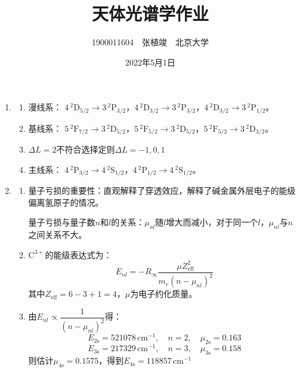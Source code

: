 \documentclass[a4paper]{article}
\begin{document}
\title{\textbf{天体光谱学作业}}
\author{1900011604\ \ 张植竣\ \ 北京大学}
\date{2022年5月1日}
\maketitle

\begin{enumerate}

    \item[1.]
    \begin{enumerate}
        \item[(a)] 漫线系：
        $4\,^2\mathrm{D}_{5/2} \rightarrow 3\,^2\mathrm{P}_{3/2}$，$4\,^2\mathrm{D}_{3/2} \rightarrow 3\,^2\mathrm{P}_{3/2}$，$4\,^2\mathrm{D}_{3/2} \rightarrow 3\,^2\mathrm{P}_{1/2}$。

        \item[(b)] 基线系：
        $5\,^2\mathrm{F}_{7/2} \rightarrow 3\,^2\mathrm{D}_{5/2}$，$5\,^2\mathrm{F}_{5/2} \rightarrow 3\,^2\mathrm{D}_{5/2}$，$5\,^2\mathrm{F}_{5/2} \rightarrow 3\,^2\mathrm{D}_{3/2}$。

        \item[(c)] $\Delta L=2$不符合选择定则$\Delta L=-1,0,1$

        \item[(d)] 主线系：
        $4\,^2\mathrm{P}_{3/2} \rightarrow 4\,^2\mathrm{S}_{1/2}$，$4\,^2\mathrm{P}_{1/2} \rightarrow 4\,^2\mathrm{S}_{1/2}$。
    \end{enumerate}

    \bigskip
    \item[2.]
    \begin{enumerate}
        \item[(a)]
        量子亏损的重要性：直观解释了穿透效应，解释了碱金属外层电子的能级偏离氢原子的情况。

        量子亏损与量子数$n$和$l$的关系：$\mu_{nl}$随$l$增大而减小，对于同一个$l$，$\mu_{nl}$与$n$之间关系不大。

        \item[(b)]
        $\mathrm{C}^{3+}$的能级表达式为：
        \[
            E_{nl} = -R_\infty \frac{\mu Z_{\mathrm{eff}}^2}{m_e(n-\mu_{nl})^2}
        \]
        其中$Z_{\mathrm{eff}}=6-3+1=4$，$\mu$为电子约化质量。

        \item[(c)]
        由$E_{nl} \propto \dfrac{1}{(n-\mu_{nl})^2}$得：
        \[
            E_{\mathrm{2s}} = 521078\,\mathrm{cm^{-1}},\quad n=2,\quad \mu_{\mathrm{2s}} = 0.163
        \]
        \[
            E_{\mathrm{3s}} = 217329\,\mathrm{cm^{-1}},\quad n=3,\quad \mu_{\mathrm{3s}} = 0.158
        \]
        则估计$\mu_{\mathrm{4s}} = 0.1575$，得到$E_{\mathrm{4s}} = 118857\,\mathrm{cm^{-1}}$
    \end{enumerate}


\end{enumerate}
\end{document}
